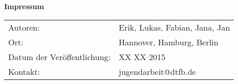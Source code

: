 \thispagestyle{empty}



\null
\vfill
\vfill
{\raggedright\bf Impressum}
\vspace{0.5cm}

{
  \raggedright

\begin{tabular}{ll}
  Autoren: & Erik, Lukas, Fabian, Jana, Jan 
    \\%
  Ort: &  Hannover, Hamburg, Berlin
    \\%
  Datum der Veröffentlichung: & XX XX 2015
    \\%
  Kontakt: & jugendarbeit@dtfb.de
    \\%
\end{tabular}
}
\vfill

